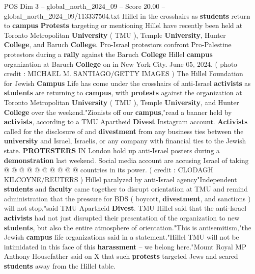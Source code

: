 \begin{textsample}{POS Dim 3 – global\_north\_2024\_09 – Score 20.00 – global\_north\_2024\_09/113337504.txt}  \label{ex:f3_pos_161}
Hillel in the crosshairs as \textbf{students} return to \textbf{campus} \textbf{Protests} targeting or mentioning Hillel have recently been held at Toronto Metropolitan \textbf{University} ( TMU ), Temple \textbf{University}, Hunter \textbf{College}, and Baruch \textbf{College}.
Pro-Israel protestors confront Pro-Palestine protestors during a \textbf{rally} against the Baruch \textbf{College} Hillel \textbf{campus} organization at Baruch \textbf{College} on in New York City.
June 05, 2024. ( photo credit : MICHAEL M.
SANTIAGO/GETTY IMAGES ) The Hillel Foundation for Jewish \textbf{Campus} Life has come under the crosshairs of anti-Israel \textbf{activists} as \textbf{students} are returning to \textbf{campus}, with \textbf{protests} against the organization at Toronto Metropolitan \textbf{University} ( TMU ), Temple \textbf{University}, and Hunter \textbf{College} over the weekend."Zionists off our \textbf{campus},"read a banner held by \textbf{activists}, according to a TMU Apartheid \textbf{Divest} Instagram account. \textbf{Activists} called for the disclosure of and \textbf{divestment} from any business ties between the \textbf{university} and Israel, Israelis, or any company with financial ties to the Jewish state. \textbf{PROTESTERS} IN London hold up anti-Israel posters during a \textbf{demonstration} last weekend.
Social media account are accusing Israel of taking @ @ @ @ @ @ @ @ @ @ countries in its power. ( credit : CLODAGH KILCOYNE/REUTERS ) Hillel paralyzed by anti-Israel agency"Independent \textbf{students} and \textbf{faculty} came together to disrupt orientation at TMU and remind administration that the pressure for BDS ( boycott, \textbf{divestment}, and sanctions ) will not stop,"said TMU Apartheid \textbf{Divest}.
TMU Hillel said that the anti-Israel \textbf{activists} had not just disrupted their presentation of the organization to new \textbf{students}, but also the entire atmosphere of orientation."This is antisemitism,"the Jewish \textbf{campus} life organizations said in a statement."Hillel TMU will not be intimidated in this face of this \textbf{harassment} -- we belong here."Mount Royal MP Anthony Housefather said on X that such \textbf{protests} targeted Jews and scared \textbf{students} away from the Hillel table.

\end{textsample}
